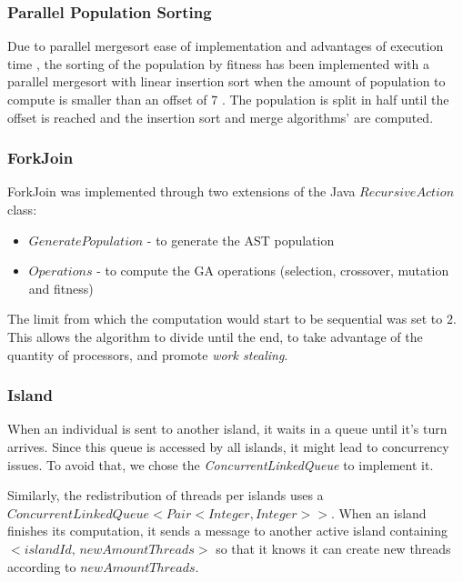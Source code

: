 \documentclass[runningheads]{llncs}
\begin{document}
\subsubsection{Parallel Population Sorting} \label{subsubsec:parallelSort} \hfill \par
Due to parallel mergesort ease of implementation and advantages of execution time \cite{analysisMergeSort}, the sorting of the population by fitness has been implemented with a parallel mergesort with linear insertion sort when the amount of population to compute is smaller than an offset of 7 .%
The population is split in half until the offset is reached and the insertion sort and merge algorithms' are computed.

\subsubsection{ForkJoin} \hfill \par
ForkJoin was implemented through two extensions of the Java \(RecursiveAction\) class:

\begin{itemize}
\item $GeneratePopulation$ - to generate the AST population
\item $Operations$ - to compute the GA operations (selection, crossover, mutation and fitness)
\end{itemize}

The limit from which the computation would start to be sequential was set to $2$. This allows the algorithm to divide until the end, to take advantage of the quantity of processors, and promote \textit{work stealing}.
\subsubsection{Island} \hfill \par

When an individual is sent to another island, it waits in a queue until it's turn arrives. Since this queue is accessed by all islands, it might lead to concurrency issues. To avoid that, we chose the \emph{ConcurrentLinkedQueue} to implement it.

Similarly, the redistribution of threads per islands uses a \(ConcurrentLinkedQueue<Pair<Integer, Integer>>\). When an island finishes its computation, it sends a message to another active island containing \(<islandId, \,newAmountThreads>\) so that it knows it can create new threads according to $newAmountThreads$.
\end{document}
